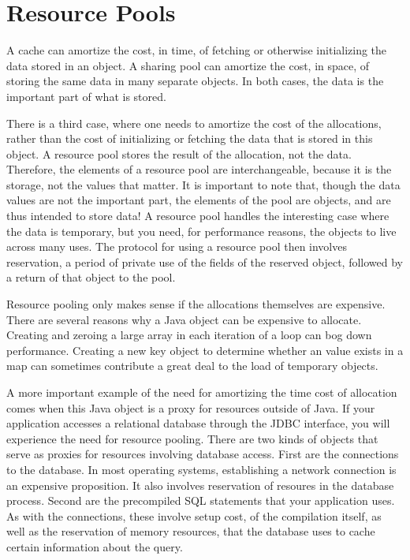 \section{Resource Pools}
\label{sec:resource-pools}

A cache can amortize the cost, in time, of fetching or otherwise initializing the
data stored in an object. A sharing pool can amortize the cost, in space, of
storing the same data in many separate objects. In both cases, the data is the
important part of what is stored.

 There is a third case,
where one needs to amortize the cost of the allocations, rather than the cost of
initializing or fetching the data that is stored in this object. A resource pool
stores the result of the allocation, not the data. Therefore, the elements of a
resource pool are interchangeable, because it is the storage, not the values that
matter. It is important to note that, though the data values are not the
important part, the elements of the pool are objects, and are thus intended to
store data! A resource pool handles the interesting case where the data is
temporary, but you need, for performance reasons, the objects to live across many
uses. The protocol for using a resource pool then involves reservation, a period
of private use of the fields of the reserved object, followed by a return of that
object to the pool.

Resource pooling only makes sense if the allocations themselves are expensive.
There are several reasons why a Java object can be expensive to allocate.
Creating and zeroing a large array in each iteration of a
loop can bog down performance. Creating a new key object to determine whether an
value exists in a map can sometimes contribute a great deal to the load of
temporary objects.

A more important example of the need for amortizing the time cost of allocation
comes when this Java object is a proxy for resources outside of Java. If your
application accesses a relational database through the JDBC
interface, you will experience the need for resource pooling. There are two kinds
of objects that serve as proxies for resources involving database access. First
are the connections to the database. In most operating systems, establishing a
network connection is an expensive proposition. It also involves reservation of
resoures in the database process. Second are the precompiled SQL statements that
your application uses. As with the connections, these involve setup cost, of the
compilation itself, as well as the reservation of memory resources, that the
database uses to cache certain information about the query.

